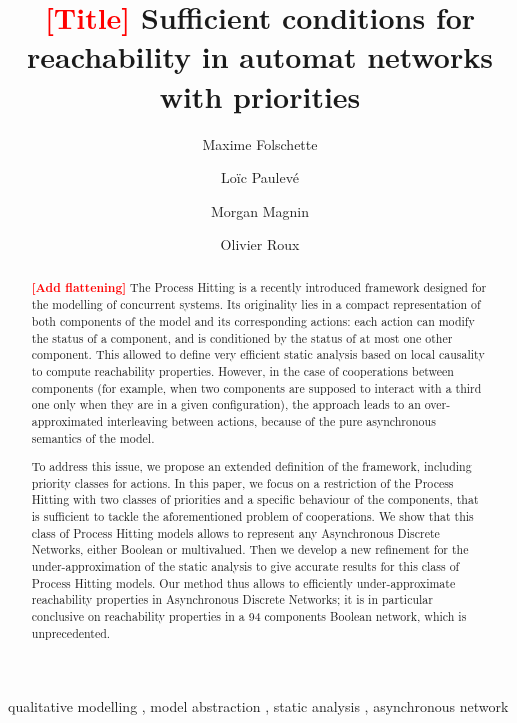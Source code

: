 \documentclass{elsarticle}
\newcommand{\todo}[1]{\textcolor{red}{\textbf{[#1]}}}
\begin{document}
\begin{frontmatter}
\title{\todo{Title} Sufficient conditions for reachability in automat networks with priorities}

\author[irccyn]{Maxime Folschette}
\author[lri,amib]{Loïc Paulevé}
\author[irccyn]{Morgan Magnin}
\author[irccyn]{Olivier Roux}

\address[irccyn]{LUNAM Universit\'e, \'Ecole Centrale de Nantes, IRCCyN UMR CNRS 6597\\
(Institut de Recherche en Communications et Cybern\'etique de Nantes)\\
1 rue de la No\"e - B.P. 92101 - 44321 Nantes Cedex 3, France.}

\address[lri]{CNRS, Laboratoire de Recherche en Informatique (LRI)\\
		Université Paris-Sud - CNRS UMR 8623, France}
\address[amib]{AMIB group, Inria Saclay, France}{}



\begin{abstract}
\todo{Add flattening}
The Process Hitting is a recently introduced framework designed for the modelling of concurrent systems.
Its originality lies in a compact representation of both components of the model and its corresponding actions:
each action can modify the status of a component, and is conditioned by the status of at most one other component.
This allowed to define very efficient static analysis based on local causality to compute reachability properties.
However, in the case of cooperations between components (for example, when two components are supposed to interact with a third one only when they are in a given configuration), the approach leads to an over-approximated interleaving between actions, because of the pure asynchronous semantics of the model.

To address this issue, we propose an extended definition of the framework, including priority classes for actions.
In this paper, we focus on a restriction of the Process Hitting with two classes of priorities and a specific behaviour of the components, that is sufficient to tackle the aforementioned problem of cooperations.
We show that this class of Process Hitting models allows to represent any Asynchronous Discrete Networks, either Boolean or multivalued.
Then we develop a new refinement for the under-approximation of the static analysis to give accurate results for this class of Process Hitting models.
Our method thus allows to efficiently under-approximate reachability properties in Asynchronous Discrete Networks;
it is in particular conclusive on reachability properties in a 94 components Boolean network, which is unprecedented.
\end{abstract}
\begin{keyword}
qualitative modelling \sep
model abstraction \sep
static analysis \sep
asynchronous network
\end{keyword}
\end{frontmatter}
\end{document}

